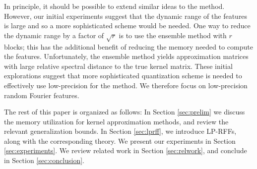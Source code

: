 In principle, it should be possible to extend similar ideas to the \Nystrom method. However, our initial experiments suggest that the dynamic range of the \Nystrom features is large and so a more sophisticated scheme would be needed. One way to reduce the dynamic range by a factor of $\sqrt{r}$ is to use the ensemble \Nystrom method \citep{ensemble09} with $r$ blocks; this has the additional benefit of reducing the memory needed to compute the features. Unfortunately, the ensemble method yields approximation matrices with large relative spectral distance to the true kernel matrix. These initial explorations suggest that more sophisticated quantization scheme is needed to effectively use low-precision for the \Nystrom method. We therefore focus on low-precision random Fourier features.



The rest of this paper is organized as follows: In Section \ref{sec:prelim} we discuss the memory utilization for kernel approximation methods, and review the relevant generalization bounds.  In Section \ref{sec:lprff}, we introduce LP-RFFs, along with the corresponding theory. We present our experiments in Section \ref{sec:experiments}.  We review related work in Section \ref{sec:relwork}, and conclude in Section \ref{sec:conclusion}.
